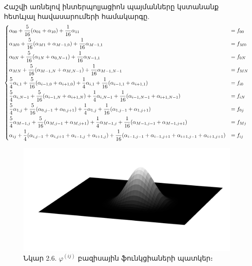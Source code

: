 \documentclass[fleqn, bachelor,subf,12pt,notitlepage]{article}
\begin{document}
Հաշվի առնելով ինտերպոլյացիոն պայմանները կստանանք հետևյալ հավասարումերի համակարգը.
\begin{equation}
\begin{dcases}
\alpha_{00}+\frac{5}{16}(\alpha_{01} + \alpha_{10}) +\frac{1}{16}\alpha_{11} &= f_{00}\\
\alpha_{M0}+\frac{5}{16}(\alpha_{M1} + \alpha_{M-1,0}) +\frac{1}{16}\alpha_{M-1, 1} &= f_{M0}\\
\alpha_{0N}+\frac{5}{16}(\alpha_{1N} + \alpha_{0,N-1}) +\frac{1}{16}\alpha_{N-1, 1} &= f_{0N}\\
\alpha_{MN}+\frac{5}{16}(\alpha_{M-1,N} + \alpha_{M,N-1}) +\frac{1}{16}\alpha_{M-1,N-1} &= f_{MN}\\
\frac{5}{4}\alpha_{i,1}+\frac{5}{16}(\alpha_{i-1,0} + \alpha_{i+1,0}) +\frac{1}{4}\alpha_{i,1} + \frac{1}{16}(\alpha_{i-1,1}+\alpha_{i+1,1}) &= f_{i0}\\
\frac{5}{4}\alpha_{i,N-1}+\frac{5}{16}(\alpha_{i-1,N} + \alpha_{i+1,N}) +\frac{1}{4}\alpha_{i,N-1} + \frac{1}{16}(\alpha_{i-1,N-1}+\alpha_{i+1,N-1}) &= f_{iN}\\
\frac{5}{4}\alpha_{1,j}+\frac{5}{16}(\alpha_{0,j-1} + \alpha_{0,j+1}) +\frac{1}{4}\alpha_{1,j} + \frac{1}{16}(\alpha_{1,j-1}+\alpha_{1,j+1}) &= f_{0j}\\
\frac{5}{4}\alpha_{M-1,j}+\frac{5}{16}(\alpha_{M,j-1} + \alpha_{M,j+1}) +\frac{1}{4}\alpha_{M-1,j} + \frac{1}{16}(\alpha_{M-1,j-1}+\alpha_{M-1,j+1})& = f_{Mj}\\
\alpha_{ij} + \frac{1}{4}(\alpha_{i,j-1} + \alpha_{i,j+1} + \alpha_{i-1,j} + \alpha_{i+1,j}) + \frac{1}{16}(\alpha_{i-1,j-1} + \alpha_{i-1,j+1} + \alpha_{i+1,j-1} +\alpha_{i+1,j+1}) &= f_{ij}
\end{dcases}
\end{equation}
\newpage
\begin{figure}[h!]
\centering
\includegraphics[width=1.0\textwidth]{images/two_dimensional_basis}
\captionsetup{labelformat=empty}
\caption{Նկար 2.6. $\varphi^{(ij)}$ բազիսային ֆունկցիաների պատկեր։}
\end{figure}
\end{document}
